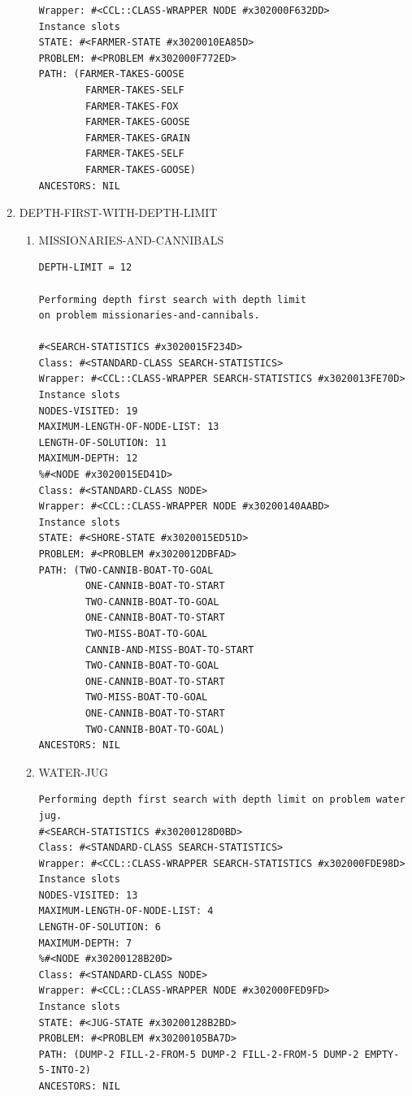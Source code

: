 \documentclass[a4paper,6pt]{article}
\begin{document}
\begin{enumerate}
\begin{enumerate}
\begin{verbatim}
Wrapper: #<CCL::CLASS-WRAPPER NODE #x302000F632DD>
Instance slots
STATE: #<FARMER-STATE #x3020010EA85D>
PROBLEM: #<PROBLEM #x302000F772ED>
PATH: (FARMER-TAKES-GOOSE
        FARMER-TAKES-SELF
        FARMER-TAKES-FOX
        FARMER-TAKES-GOOSE
        FARMER-TAKES-GRAIN
        FARMER-TAKES-SELF
        FARMER-TAKES-GOOSE)
ANCESTORS: NIL
\end{verbatim}
\end{enumerate}
\item DEPTH-FIRST-WITH-DEPTH-LIMIT
\label{sec-1-2-3}
\begin{enumerate}
\item MISSIONARIES-AND-CANNIBALS
\label{sec-1-2-3-1}
\begin{verbatim}
DEPTH-LIMIT = 12

Performing depth first search with depth limit 
on problem missionaries-and-cannibals.

#<SEARCH-STATISTICS #x3020015F234D>
Class: #<STANDARD-CLASS SEARCH-STATISTICS>
Wrapper: #<CCL::CLASS-WRAPPER SEARCH-STATISTICS #x3020013FE70D>
Instance slots
NODES-VISITED: 19
MAXIMUM-LENGTH-OF-NODE-LIST: 13
LENGTH-OF-SOLUTION: 11
MAXIMUM-DEPTH: 12
%#<NODE #x3020015ED41D>
Class: #<STANDARD-CLASS NODE>
Wrapper: #<CCL::CLASS-WRAPPER NODE #x30200140AABD>
Instance slots
STATE: #<SHORE-STATE #x3020015ED51D>
PROBLEM: #<PROBLEM #x3020012DBFAD>
PATH: (TWO-CANNIB-BOAT-TO-GOAL
        ONE-CANNIB-BOAT-TO-START
        TWO-CANNIB-BOAT-TO-GOAL
        ONE-CANNIB-BOAT-TO-START
        TWO-MISS-BOAT-TO-GOAL
        CANNIB-AND-MISS-BOAT-TO-START
        TWO-CANNIB-BOAT-TO-GOAL
        ONE-CANNIB-BOAT-TO-START
        TWO-MISS-BOAT-TO-GOAL
        ONE-CANNIB-BOAT-TO-START
        TWO-CANNIB-BOAT-TO-GOAL)
ANCESTORS: NIL
\end{verbatim}

\item WATER-JUG
\label{sec-1-2-3-2}
\begin{verbatim}
Performing depth first search with depth limit on problem water jug.
#<SEARCH-STATISTICS #x30200128D0BD>
Class: #<STANDARD-CLASS SEARCH-STATISTICS>
Wrapper: #<CCL::CLASS-WRAPPER SEARCH-STATISTICS #x302000FDE98D>
Instance slots
NODES-VISITED: 13
MAXIMUM-LENGTH-OF-NODE-LIST: 4
LENGTH-OF-SOLUTION: 6
MAXIMUM-DEPTH: 7
%#<NODE #x30200128B20D>
Class: #<STANDARD-CLASS NODE>
Wrapper: #<CCL::CLASS-WRAPPER NODE #x302000FED9FD>
Instance slots
STATE: #<JUG-STATE #x30200128B2BD>
PROBLEM: #<PROBLEM #x30200105BA7D>
PATH: (DUMP-2 FILL-2-FROM-5 DUMP-2 FILL-2-FROM-5 DUMP-2 EMPTY-5-INTO-2)
ANCESTORS: NIL
\end{verbatim}


\end{enumerate}
\end{enumerate}
\end{document}
